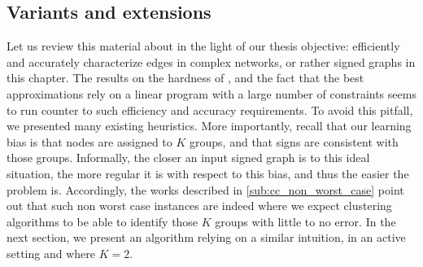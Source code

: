 

\begin{aside}
\subsection{Variants and extensions}
\label{sub:variants_and_extensions}

\end{aside}

Let us review this material about \pcc{} in the light of our thesis objective: efficiently and
accurately characterize edges in complex networks, or rather signed graphs in this chapter. The
results on the hardness of \pcc{}, and the fact that the best approximations rely on a linear
program with a large number of constraints seems to run counter to such efficiency and accuracy
requirements. To avoid this pitfall, we presented many existing heuristics. More importantly, recall
that our learning bias is that nodes are assigned to $K$ groups, and that signs are consistent
with those groups. Informally, the closer an input signed graph is to this ideal situation, the more
regular it is with respect to this bias, and thus the easier the \esp{} problem is. Accordingly, the
works described in \autoref{sub:cc_non_worst_case} point out that such non worst case instances are
indeed where we expect clustering algorithms to be able to identify those $K$ groups with little to
no error. In the next section, we present an algorithm relying on a similar intuition, in an active
setting and where $K=2$.
